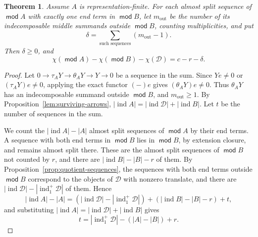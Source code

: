 \documentclass[a4paper,reqno,10pt]{amsart}
\newtheorem{theorem}{Theorem}[section]
\theoremstyle{definition}
\numberwithin{equation}{section}
\DeclareMathOperator{\moduleCategory}{\mathsf{mod}}
\renewcommand{\mod}{\moduleCategory}
\DeclareMathOperator{\ind}{ind}
\newcommand{\cD}{\mathcal D}
\begin{document}
\begin{theorem}\label{thm:serre-magnitude}
Assume \(A\) is representation-finite. For each almost split sequence
of \(\mod A\) with exactly one end term in \(\mod B\), let \(m_{\mathrm{out}}\) be the
number of its indecomposable middle summands outside \(\mod B\), counting
multiplicities, and put
\[
 \delta=\sum_{\text{such sequences}}(m_{\mathrm{out}}-1).
\]
Then \(\delta\geq0\), and
\begin{equation}\label{eq:serre-magnitude}
 \chi(\mod A)-\chi(\mod B)-\chi(\cD)=c-r-\delta.
\end{equation}
\end{theorem}
\begin{proof}
Let \(0\to\tau_A Y\to\theta_A Y\to Y\to0\) be a sequence in the sum.
Since \(Ye\ne0\) or \((\tau_A Y)e\ne0\), applying the exact functor
\((-)e\) gives \((\theta_A Y)e\ne0\). Thus \(\theta_A Y\) has an
indecomposable summand outside \(\mod B\), and
\(m_{\mathrm{out}}\geq1\).
By Proposition~\ref{lem:surviving-arrows},
\(|\ind A|=|\ind\cD|+|\ind B|\). Let \(t\) be the number of sequences in
the sum.

We count the \(|\ind A|-|A|\) almost split sequences of \(\mod A\) by their
end terms. A sequence with both end terms in \(\mod B\) lies in \(\mod B\), by
extension closure, and remains almost split there. These are the
almost split sequences of \(\mod B\) not counted by \(r\), and there are
\(|\ind B|-|B|-r\) of them. By
Proposition~\ref{prop:quotient-sequences}, the sequences with both
end terms outside \(\mod B\) correspond to the objects of \(\cD\) with
nonzero translate, and there are \(|\ind\cD|-|\ind_1^+\cD|\) of them. Hence
\[
 |\ind A|-|A|=(|\ind\cD|-|\ind_1^+\cD|)+(|\ind B|-|B|-r)+t,
\]
and substituting \(|\ind A|=|\ind\cD|+|\ind B|\) gives
\begin{equation}\label{eq:count-t}
 t=|\ind_1^+\cD|-(|A|-|B|)+r.
\end{equation}


\end{proof}
\end{document}
